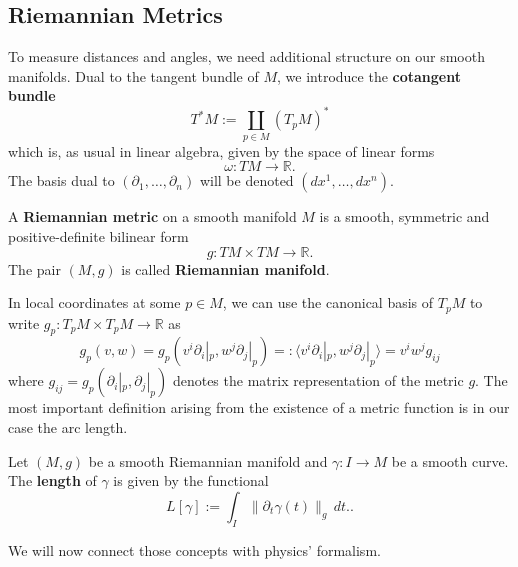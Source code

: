 \subsection*{Riemannian Metrics}
To measure distances and angles, we need additional structure on our smooth manifolds. Dual to the tangent bundle of $M$, we introduce the \textbf{cotangent bundle}
\[
    T^\ast M:= \coprod_{p \in M} (T_pM)^\ast
\] which is, as usual in linear algebra, given by the space of linear forms
\[
\omega: TM \to \mathbb{R}
.\] The basis dual to $(\partial_1, \dots, \partial_n)$ will be denoted $(dx^1, \dots, dx^n)$. 
\begin{definition}
    A \textbf{Riemannian metric} on a smooth manifold $M$ is a smooth, symmetric and positive-definite bilinear form
    \[
    g: TM \times TM \to \mathbb{R}
    .\] The pair $(M,g)$ is called \textbf{Riemannian manifold}.
\end{definition}
In local coordinates at some $p \in M$, we can use the canonical basis of $T_pM$ to write $g_p: T_pM \times T_p M \to \mathbb{R}$ as
\[
    g_p(v,w) = g_p(v^i \partial_i|_p, w^j \partial_j|_p) =: \langle v^i\partial_i|_p, w^j \partial_j|_p \rangle =  v^i w^j g_{ij}
\] where $g_{ij}=g_p(\partial_i|_p, \partial_j|_p)$ denotes the matrix representation of the metric $g$. The most important definition arising from the existence of a metric function is in our case the arc length.
\begin{definition}[Length]
    Let $(M,g)$ be a smooth Riemannian manifold and $\gamma: I \to M$ be a smooth curve. The \textbf{length} of $\gamma$ is given by the functional
    \[
        L[\gamma]:= \int_I \| \partial_t \gamma(t)\|_g \, dt.
    .\] 
\end{definition}
We will now connect those concepts with physics' formalism.
